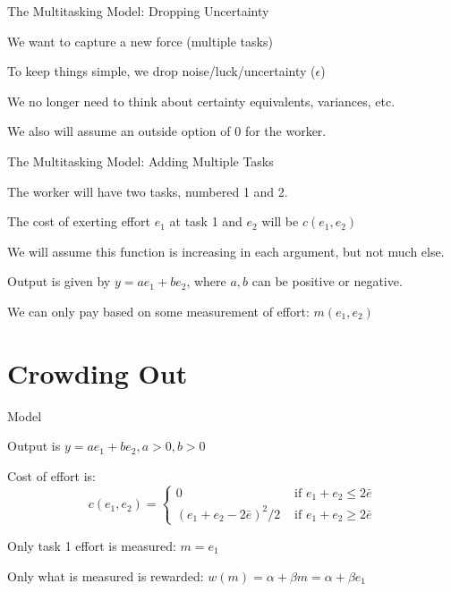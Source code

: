 \documentclass[aspectratio=169,usenames,dvipsnames]{beamer}
\newenvironment{wideitemize}{\itemize\addtolength{\itemsep}{10pt}}{\enditemize}
\begin{document}
\begin{frame}{The Multitasking Model: Dropping Uncertainty}
    \begin{wideitemize}
        \item We want to capture a new force (multiple tasks)
        \item To keep things simple, we drop noise/luck/uncertainty ($\epsilon$)
        \item We no longer need to think about certainty equivalents, variances, etc.
        \item We also will assume an outside option of 0 for the worker.
    \end{wideitemize}
\end{frame}

\begin{frame}{The Multitasking Model: Adding Multiple Tasks}
    \begin{wideitemize}
        \item The worker will have two tasks, numbered 1 and 2.
        \item The cost of exerting effort $e_1$ at task 1 and $e_2$ will be $c(e_1, e_2)$
        \item We will assume this function is increasing in each argument, but not much else.
        \item Output is given by $y=a e_1 + b e_2$, where $a,b$ can be positive or negative.
        \item We can only pay based on some measurement of effort: $m(e_1, e_2)$
    \end{wideitemize}
\end{frame}


\section{Crowding Out}

\begin{frame}{Model}
\begin{wideitemize}
    \item Output is $y=a e_1+b e_2, a>0, b>0$
    \item Cost of effort is:
       \[c(e_1, e_2) = \begin{cases}
            0 & \text{ if }  e_1+e_2 \leq 2 \bar e \\
            (e_1+e_2-2\bar e)^2/2 & \text{ if } e_1+e_2 \geq 2 \bar e 
        \end{cases}\]
    \item Only task 1 effort is measured: $m=e_1$
    \item Only what is measured is rewarded: $w(m)=\alpha + \beta m =\alpha + \beta e_1$
\end{wideitemize}
    
\end{frame}
\end{document}
